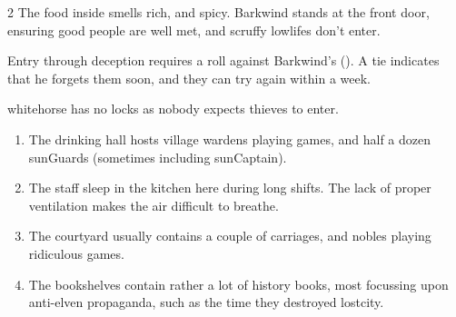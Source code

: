 \begin{multicols}{2}
The food inside smells rich, and spicy.
Barkwind stands at the front door, ensuring good people are well met, and scruffy lowlifes don't enter.



Entry through deception requires a roll against Barkwind's  (\tn).
A tie indicates that he forgets them soon, and they can try again within a week.

\Gls{whitehorse} has no locks as nobody expects thieves to enter.
 
\null
\bigbreak

\begin{enumerate}
  \item
  The drinking hall hosts \gls{village} \glspl{warden} playing games, and half a dozen \glspl{sunGuard} (sometimes including \gls{sunCaptain}).
  \label{horseHall}
  \item
  \label{horseKitch}
  The staff sleep in the kitchen here during long shifts.
  The lack of proper ventilation makes the air difficult to breathe.
  \item
  \label{horseYard}
  The courtyard usually contains a couple of carriages, and nobles playing ridiculous games.
  \item
  \label{horseUpstairs}
  The bookshelves contain rather a lot of history books, most focussing upon anti-elven propaganda, such as the time they destroyed \gls{lostcity}.


\end{enumerate}
\end{multicols}
